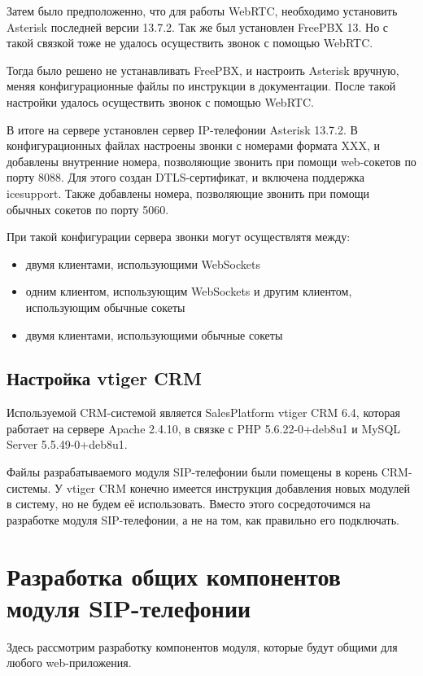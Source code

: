 Затем было предположенно, что для работы WebRTC, необходимо установить Asterisk последней версии 13.7.2. Так же был установлен FreePBX 13. Но с такой связкой тоже не удалось осуществить звонок с помощью WebRTC.

Тогда было решено не устанавливать FreePBX, и настроить Asterisk вручную, меняя конфигурационные файлы по инструкции в документации.\cite{asterisk} После такой настройки удалось осуществить звонок с помощью WebRTC.

В итоге на сервере установлен сервер IP-телефонии Asterisk 13.7.2. В конфигурационных файлах настроены звонки с номерами формата XXX, и добавлены внутренние номера, позволяющие звонить при помощи web-сокетов по порту 8088. Для этого создан DTLS-сертификат, и включена поддержка icesupport. Также добавлены номера, позволяющие звонить при помощи обычных сокетов по порту 5060.

При такой конфигурации сервера звонки могут осуществлятя между:
\begin{itemize}
\item двумя клиентами, использующими WebSockets
\item одним клиентом, использующим WebSockets и другим клиентом, использующим обычные сокеты
\item двумя клиентами, использующими обычные сокеты
\end{itemize}


\subsection{Настройка vtiger CRM}

Используемой CRM-системой является SalesPlatform vtiger CRM 6.4, которая работает на сервере Apache 2.4.10, в связке с PHP 5.6.22-0+deb8u1 и MySQL Server 5.5.49-0+deb8u1.

Файлы разрабатываемого модуля SIP-телефонии были помещены в корень CRM-системы. У vtiger CRM конечно имеется инструкция добавления новых модулей в систему, но не будем её использовать. Вместо этого сосредоточимся на разработке модуля SIP-телефонии, а не на том, как правильно его подключать.

\section{Разработка общих компонентов модуля SIP-телефонии}

Здесь рассмотрим разработку компонентов модуля, которые будут общими для любого web-приложения.

